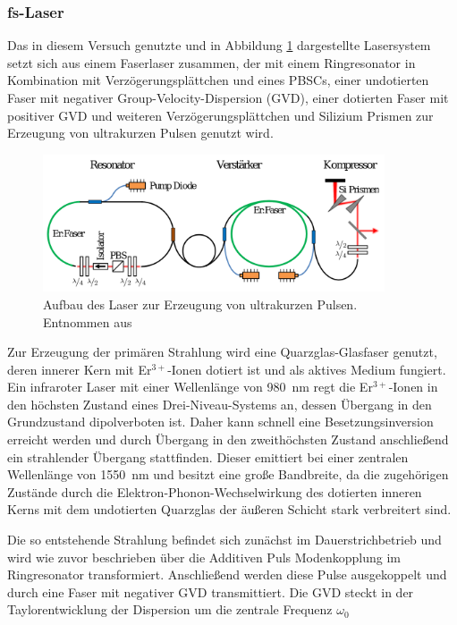     \newpage
    \subsubsection{fs-Laser}

      Das in diesem Versuch genutzte und in Abbildung \ref{fig:Laser} dargestellte Lasersystem setzt sich aus einem Faserlaser zusammen, der mit einem Ringresonator in Kombination mit Verzögerungsplättchen 
      und eines PBSCs, einer undotierten Faser mit negativer Group-Velocity-Dispersion (GVD), einer dotierten Faser mit positiver GVD und weiteren Verzögerungsplättchen und Silizium Prismen zur Erzeugung von
      ultrakurzen Pulsen genutzt wird. 

      \FloatBarrier
      \begin{figure}[h]
        \centering
        \includegraphics[width = 0.9\textwidth]{pictures/Laser.png}
        \caption{Aufbau des Laser zur Erzeugung von ultrakurzen Pulsen. Entnommen aus \cite{tu_dortmund_versuchsanleitung_nodate}}
        \label{fig:Laser}
      \end{figure}
      \FloatBarrier

      Zur Erzeugung der primären Strahlung wird eine Quarzglas-Glasfaser genutzt, deren innerer Kern mit Er$^{3+}$-Ionen dotiert ist und als aktives Medium fungiert. Ein infraroter Laser mit einer Wellenlänge von 
      \SI{980}{\nano\metre} regt die Er$^{3+}$-Ionen in den höchsten Zustand eines Drei-Niveau-Systems an, dessen Übergang in den Grundzustand dipolverboten ist. Daher kann schnell eine Besetzungsinversion
      erreicht werden und durch Übergang in den zweithöchsten Zustand anschließend ein strahlender Übergang stattfinden. Dieser emittiert bei einer zentralen Wellenlänge von \SI{1550}{\nano\metre} und besitzt 
      eine große Bandbreite, da die zugehörigen Zustände durch die Elektron-Phonon-Wechselwirkung des dotierten inneren Kerns mit dem undotierten Quarzglas der äußeren Schicht stark verbreitert sind.
      
      Die so entstehende Strahlung befindet sich zunächst im Dauerstrichbetrieb und wird wie zuvor beschrieben über die Additiven Puls Modenkopplung im Ringresonator transformiert. Anschließend werden diese 
      Pulse ausgekoppelt und durch eine Faser mit negativer GVD transmittiert. Die GVD steckt in der Taylorentwicklung der Dispersion um die zentrale Frequenz $\omega_0$
      
